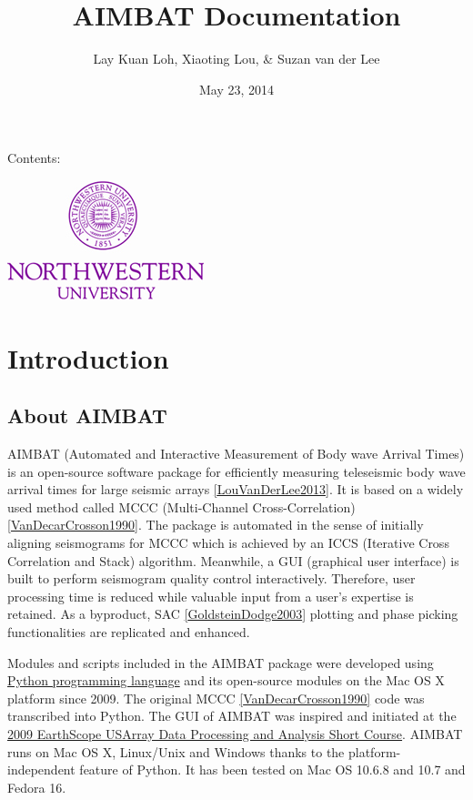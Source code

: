 \documentclass[letterpaper,10pt,english]{sphinxmanual}
\title{AIMBAT Documentation}
\date{May 23, 2014}
\author{Lay Kuan Loh, Xiaoting Lou, \& Suzan van der Lee}
\begin{document}
\maketitle
\tableofcontents
{}\label{index::doc}


Contents:

\includegraphics{NU_Logo_purple.jpg}


\chapter{Introduction}
\label{docfiles/introduction:introduction}\label{docfiles/introduction:welcome-to-aimbat-s-documentation}\label{docfiles/introduction::doc}

\section{About AIMBAT}
\label{docfiles/introduction:about-aimbat}
AIMBAT (Automated and Interactive Measurement of Body wave Arrival Times) is an open-source software package for efficiently measuring teleseismic body wave arrival times for large seismic arrays {\hyperref[docfiles/citations:louvanderlee2013]{{[}LouVanDerLee2013{]}}}. It is based on a widely used method called MCCC (Multi-Channel Cross-Correlation) {\hyperref[docfiles/citations:vandecarcrosson1990]{{[}VanDecarCrosson1990{]}}}. The package is automated in the sense of initially aligning seismograms for MCCC which is achieved by an ICCS (Iterative Cross Correlation and Stack) algorithm. Meanwhile, a GUI (graphical user interface) is built to perform seismogram quality control interactively. Therefore, user processing time is reduced while valuable input from a user's expertise is retained. As a byproduct, SAC {\hyperref[docfiles/citations:goldsteindodge2003]{{[}GoldsteinDodge2003{]}}} plotting and phase picking functionalities are replicated and enhanced.

Modules and scripts included in the AIMBAT package were developed using \href{http://www.python.org/}{Python programming language} and its open-source modules on the Mac OS X platform since 2009. The original MCCC {\hyperref[docfiles/citations:vandecarcrosson1990]{{[}VanDecarCrosson1990{]}}} code was transcribed into Python. The GUI of AIMBAT was inspired and initiated at the \href{http://www.iris.edu/hq/es\_course/content/2009.html}{2009 EarthScope USArray Data Processing and Analysis Short Course}. AIMBAT runs on Mac OS X, Linux/Unix and Windows thanks to the platform-independent feature of Python. It has been tested on Mac OS 10.6.8 and 10.7 and Fedora 16.
\end{document}
